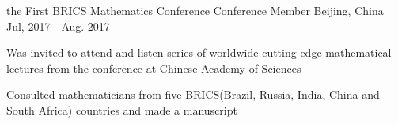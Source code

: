 \begin{cventries}

    

   \cventry
    {the First BRICS Mathematics Conference} %
    {Conference Member} %
    {Beijing, China} %
    {Jul, 2017 - Aug. 2017} %
    {
      \begin{cvitems} %
        \item {Was invited to attend and listen series of worldwide cutting-edge mathematical lectures from the conference at Chinese Academy of Sciences}
        \item {Consulted mathematicians from five BRICS(Brazil, Russia, India, China and South Africa) countries and made a manuscript}
      \end{cvitems}
    }
    
    
\end{cventries}
